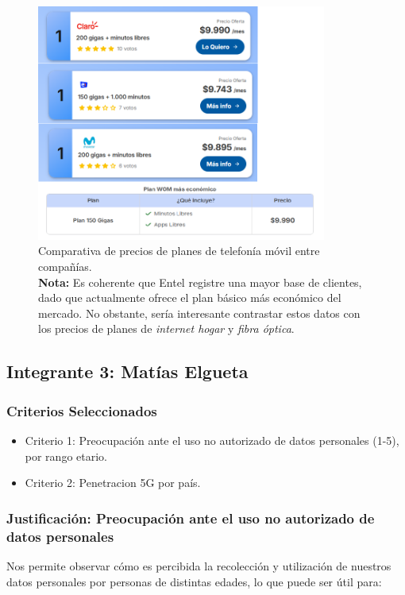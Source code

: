 \documentclass[12pt, a4paper]{article}
\begin{document}
\begin{figure}[H]
    \centering
    \includegraphics[width=0.85\textwidth]{images/contrastar.png}
    \caption[Relación precio-plan]{
        Comparativa de precios de planes de telefonía móvil entre compañías. \\
        \textbf{Nota:} Es coherente que Entel registre una mayor base de clientes, dado que actualmente ofrece el plan básico más económico del mercado. No obstante, sería interesante contrastar estos datos con los precios de planes de \textit{internet hogar} y \textit{fibra óptica}.%
    }
    \label{fig:precios_telefonia}
    
   
\end{figure}
\subsection*{Integrante 3: Matías Elgueta}

\subsubsection*{Criterios Seleccionados}
\begin{itemize}
    \item Criterio 1: Preocupación ante el uso no autorizado de datos personales (1-5), por rango etario.
    \item Criterio 2: Penetracion 5G por país.
\end{itemize}

\subsubsection*{Justificación: Preocupación ante el uso no autorizado de datos personales}
Nos permite observar cómo es percibida la recolección y utilización de nuestros datos personales por personas de distintas edades, lo que puede ser útil para:
\end{document}
